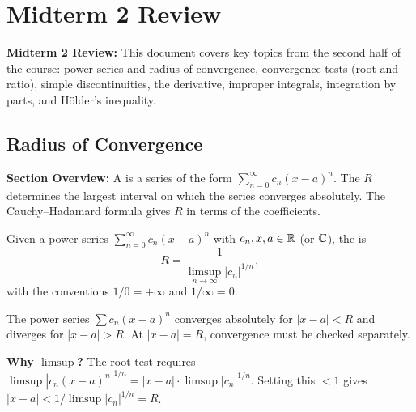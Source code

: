 \documentclass[../master/master.tex]{subfiles}
\begin{document}
\renewcommand{\lecturenum}{M2}
\renewcommand{\lecturedate}{Spring 2026}
\renewcommand{\lecturetopic}{Midterm 2 Review}

\section{Midterm 2 Review}

\begin{lecturesummary}
\textbf{Midterm 2 Review:} This document covers key topics from the second half of the course: power series and radius of convergence, convergence tests (root and ratio), simple discontinuities, the derivative, improper integrals, integration by parts, and H\"{o}lder's inequality.
\end{lecturesummary}

\subsection{Radius of Convergence}

\begin{summarybox}
\textbf{Section Overview:} A  is a series of the form $\sum_{n=0}^{\infty} c_n (x - a)^n$. The  $R$ determines the largest interval on which the series converges absolutely. The Cauchy--Hadamard formula gives $R$ in terms of the coefficients.
\end{summarybox}

\begin{definition}
Given a power series $\displaystyle\sum_{n=0}^{\infty} c_n (x-a)^n$ with $c_n, x, a \in \mathbb{R}$ (or $\mathbb{C}$), the  is
\[
    R = \frac{1}{\limsup_{n \to \infty} |c_n|^{1/n}},
\]
with the conventions $1/0 = +\infty$ and $1/\infty = 0$.
\end{definition}

\begin{theorem}
The power series $\sum c_n (x-a)^n$ converges absolutely for $|x - a| < R$ and diverges for $|x - a| > R$. At $|x - a| = R$, convergence must be checked separately.
\end{theorem}

\begin{notebox}
\textbf{Why $\limsup$?} The root test requires $\limsup |c_n(x-a)^n|^{1/n} = |x-a| \cdot \limsup |c_n|^{1/n}$. Setting this $< 1$ gives $|x-a| < 1/\limsup|c_n|^{1/n} = R$.
\end{notebox}
\end{document}
